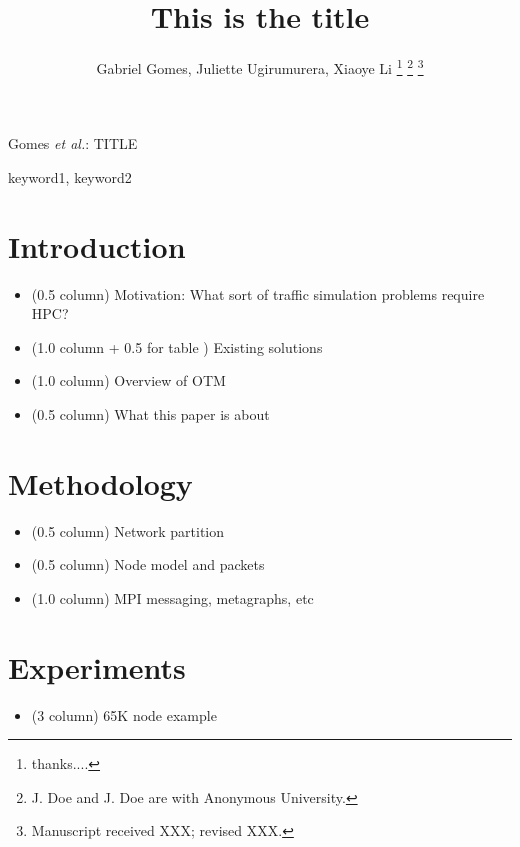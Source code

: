 \documentclass[journal]{IEEEtran}
\begin{document}
\title{This is the title}

\author{Gabriel Gomes,
        Juliette Ugirumurera,
        Xiaoye Li%
\thanks{thanks....}%
\thanks{J. Doe and J. Doe are with Anonymous University.}%
\thanks{Manuscript received XXX; revised XXX.}}

%
{Gomes \MakeLowercase{\textit{et al.}}: TITLE}

\maketitle

\begin{abstract}

\end{abstract}

\begin{IEEEkeywords}
keyword1, keyword2
\end{IEEEkeywords}

\IEEEpeerreviewmaketitle

\section{Introduction}
\begin{itemize}
\item (0.5 column) Motivation: What sort of traffic simulation problems require HPC?
\item (1.0 column + 0.5 for table ) Existing solutions
\item (1.0 column) Overview of OTM
\item (0.5 column) What this paper is about
\end{itemize}
% 

\section{Methodology}
\begin{itemize}
\item (0.5 column) Network partition
\item (0.5 column)  Node model and packets
\item (1.0 column) MPI messaging, metagraphs, etc
\end{itemize}
% 

\section{Experiments}
\begin{itemize}
\item (3 column) 65K node example 
\end{itemize}
% 
\end{document}
